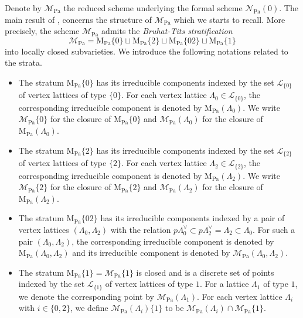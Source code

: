 \documentclass[10pt]{amsart}
\numberwithin{equation}{section}
\theoremstyle{definition}
\def\Pa{\mathrm{Pa}}
\def\calL{\mathcal{L}}
\def\calN{\mathcal{N}}
\def\calM{\mathcal{M}}
\def\rmM{\mathrm{M}}
\begin{document}
Denote by $\calM_{\Pa}$ the reduced scheme underlying the formal scheme $\calN_{\Pa}(0)$. The main result of \cite{Wanga}, \cite{Oki} concerns the structure of $\calM_{\Pa}$ which we starts to recall. More precisely, the scheme $\calM_{\Pa}$ admits the {\em Bruhat-Tits stratification} 
\begin{equation*}
\calM_{\Pa}= \rmM_{\Pa}\{0\}\sqcup  \rmM_{\Pa}\{2\} \sqcup  \rmM_{\Pa}\{02\} \sqcup \rmM_{\Pa}\{1\}
\end{equation*}
into locally closed subvarieties. We introduce the following notations related to the strata.
\begin{itemize}
\item The stratum $\rmM_{\Pa}\{0\}$ has its irreducible components indexed by the set $\calL_{\{0\}}$ of vertex lattices of type $\{0\}$. 
For each vertex lattice $\Lambda_{0}\in \calL_{\{0\}}$, the corresponding irreducible component is denoted by $\rmM_{\Pa}(\Lambda_{0})$. 
We write $\calM_{\Pa}\{0\}$ for the closure of $\rmM_{\Pa}\{0\}$ and  $\calM_{\Pa}(\Lambda_{0})$ for the closure of $\rmM_{\Pa}(\Lambda_{0})$.

\item The stratum $\rmM_{\Pa}\{2\}$ has its irreducible components indexed by the set $\calL_{\{2\}}$ of vertex lattices of type $\{2\}$. For each vertex lattice $\Lambda_{2}\in \calL_{\{2\}}$, the corresponding irreducible component is denoted by $\rmM_{\Pa}(\Lambda_{2})$. We write $\calM_{\Pa}\{2\}$ for the closure of $\rmM_{\Pa}\{2\}$ and  $\calM_{\Pa}(\Lambda_{2})$ for the closure of $\rmM_{\Pa}(\Lambda_{2})$.

\item The stratum $\rmM_{\Pa}\{02\}$ has its irreducible components indexed by a pair of vertex lattices $(\Lambda_{0}, \Lambda_{2})$ with the relation
$p\Lambda^{\vee}_{0}\subset p\Lambda^{\vee}_{2}=\Lambda_{2}\subset \Lambda_{0}$. For such a pair $(\Lambda_{0}, \Lambda_{2})$, the corresponding irreducible component is denoted by $\rmM_{\Pa}(\Lambda_{0}, \Lambda_{2})$ and its irreducible component is denoted by $\calM_{\Pa}(\Lambda_{0}, \Lambda_{2})$.

\item The stratum $\rmM_{\Pa}\{1\}=\calM_{\Pa}\{1\}$ is closed and is a discrete set of points indexed by the set  $\calL_{\{1\}}$ of vertex lattices of type $1$. For a lattice $\Lambda_{1}$ of type $1$, we denote the corresponding point by $\calM_{\Pa}(\Lambda_{1})$. For each vertex lattice $\Lambda_{i}$ with $i\in\{0,2\}$, we define $\calM_{\Pa}(\Lambda_{i})\{1\}$ to be $\calM_{\Pa}(\Lambda_{i})\cap \calM_{\Pa}\{1\}$.

\end{itemize}
\end{document}
